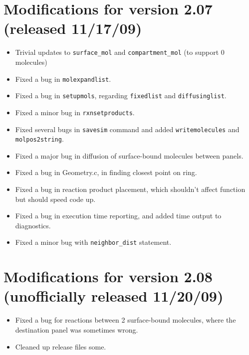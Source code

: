 \documentclass {scrbook}
\newcommand {\ttt} {\texttt}
\begin{document}
\section{Modifications for version 2.07 (released 11/17/09)}
\begin{itemize}
\item Trivial updates to \ttt{surface\_mol} and \ttt{compartment\_mol} (to support 0 molecules)
\item Fixed a bug in \ttt{molexpandlist}.
\item Fixed a bug in \ttt{setupmols}, regarding \ttt{fixedlist} and \ttt{diffusinglist}.
\item Fixed a minor bug in \ttt{rxnsetproducts}.
\item Fixed several bugs in \ttt{savesim} command and added \ttt{writemolecules} and \ttt{molpos2string}.
\item Fixed a major bug in diffusion of surface-bound molecules between panels.
\item Fixed a bug in Geometry.c, in finding closest point on ring.
\item Fixed a bug in reaction product placement, which shouldn't affect function but should speed code up.
\item Fixed a bug in execution time reporting, and added time output to diagnostics.
\item Fixed a minor bug with \ttt{neighbor\_dist} statement.
\end{itemize}

\section{Modifications for version 2.08 (unofficially released 11/20/09)}
\begin{itemize}
\item Fixed a bug for reactions between 2 surface-bound molecules, where the destination panel was sometimes wrong.
\item Cleaned up release files some.
\end{itemize}
\end{document}
